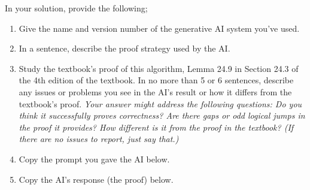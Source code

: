 \documentclass[10pt]{article}
\begin{document}
In your solution, provide the following;
\begin{enumerate}
\item Give the name and version number of the generative AI system you've used.

\solution{

}

\item In a sentence, describe the proof strategy used by the AI.

\solution{

}

\item Study the textbook's proof of this algorithm, Lemma 24.9 in Section 24.3 of the 4th edition of the textbook. In no more than 5 or 6 sentences, describe any issues or problems you see in the AI's result or how it differs from the textbook's proof.  \textit{Your answer might address the following questions: Do you think it successfully proves correctness?  Are there gaps or odd logical jumps in the proof it provides?  How different is it from the proof in the textbook?  (If there are no issues to report, just say that.)}

\solution{

}

\item Copy the prompt you gave the AI below.

\solution{

}

\item Copy the AI's response (the proof) below.

\solution{

}

\end{enumerate}
\end{document}
